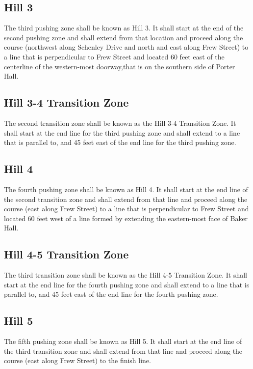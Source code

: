 \subsection{Hill 3}

	The third pushing zone shall be known as Hill 3. It shall start at the end of
	the second pushing zone and shall extend from that location and proceed along
	the course (northwest along Schenley Drive and north and east along Frew
	Street) to a line that is perpendicular to Frew Street and located 60 feet east
	of the centerline of the western-most doorway,that is on the southern side of
	Porter Hall.

\subsection{Hill 3-4 Transition Zone}

	The second transition zone shall be known as the Hill 3-4 Transition Zone. It
	shall start at the end line for the third pushing zone and shall extend to a
	line that is parallel to, and 45 feet east of the end line for the third
	pushing zone.

\subsection{Hill 4}

	The fourth pushing zone shall be known as Hill 4. It shall start at the end
	line of the second transition zone and shall extend from that line and proceed
	along the course (east along Frew Street) to a line that is perpendicular to
	Frew Street and located 60 feet west of a line formed by extending the
	eastern-most face of Baker Hall.

\subsection{Hill 4-5 Transition Zone}

	The third transition zone shall be known as the Hill 4-5 Transition Zone. It
	shall start at the end line for the fourth pushing zone and shall extend to a
	line that is parallel to, and 45 feet east of the end line for the fourth
	pushing zone.

\subsection{Hill 5}

	The fifth pushing zone shall be known as Hill 5. It shall start at the end line
	of the third transition zone and shall extend from that line and proceed along
	the course (east along Frew Street) to the finish line.

